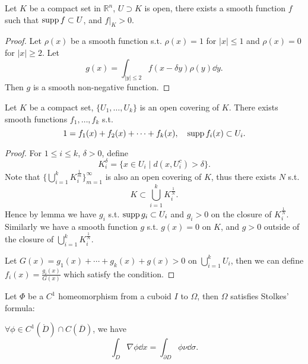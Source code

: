 \begin{lemma}
	Let $K$ be a compact set in $\mathbb{R}^{n}$, $U \supset K$ is open,
	there exists a smooth function $f$ such that
	$\operatorname{supp} f \subset U$, and $f\big|_K > 0$.
\end{lemma}
\begin{proof}[Proof]
    Let $\rho(x)$ be a smooth function s.t. $\rho(x) = 1$ for $|x|\le 1$ and
	$\rho(x) = 0$ for $|x|\ge 2$.
	Let
	\[
	g(x) = \int_{|y|\le 2} f(x - \delta y)\rho(y)\dd y.
	\]
	Then $g$ is a smooth non-negative function.
\end{proof}

\begin{theorem}
	Let $K$ be a compact set, $\{U_1, \dots, U_k\}$ is an open covering of $K$.
	There exists smooth functions $f_1,\dots, f_k$ s.t.
	\[
	1 = f_1(x) + f_2(x) + \dots + f_k(x),\quad \operatorname{supp} f_i(x) \subset U_i.
	\]
\end{theorem}
\begin{proof}[Proof]
    For $1 \le i\le k$, $\delta > 0$, define
	\[
		K_i^\delta = \{x\in U_i \mid d(x, U_i^c) > \delta\}.
	\]
	Note that $\{\bigcup_{i=1}^k K_i ^{\frac{1}{m}}\}_{m = 1}^{\infty}$
	is also an open covering of $K$, thus there exists $N$ s.t.
	\[
	K \subset \bigcup_{i=1}^k K_i^{\frac{1}{N}}.
	\]
	Hence by lemma we have $g_i$ s.t. $\operatorname{supp} g_i \subset U_i$ and
	$g_i > 0$ on the closure of $K_i^{\frac{1}{N}}$.
	Similarly we have a smooth function $g$ s.t. $g(x) = 0$ on $K$,
	and $g > 0$ outside of the closure of $\bigcup_{i=1}^k K_i^{\frac{1}{N}}$.

	Let $G(x) = g_1(x)+\cdots+g_k(x)+g(x) > 0$ on $\bigcup_{i=1}^k U_i$,
	then we can define $f_i(x) = \frac{g_i(x)}{G(x)}$ which satisfy the condition.
\end{proof}

\begin{theorem}
	Let $\Phi$ be a $C^1$ homeomorphism from a cuboid $I$ to $\Omega$,
	then $\Omega$ satisfies Stolkes' formula:

	$\forall \phi\in C^1(\mathring{D}) \cap C(\overline{D})$, we have
	\[
	\int_D \nabla \phi \dd x = \int_{\partial D}\phi \nu \dd \sigma.
	\]
\end{theorem}
